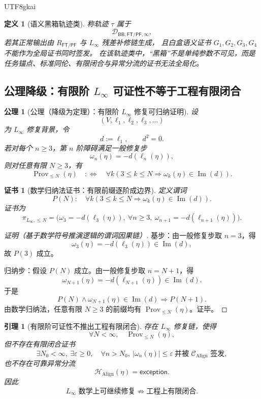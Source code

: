 \documentclass[12pt]{article}
\newtheorem{definition}{定义}[section]
\newtheorem{axiom}{公理}[section]
\newtheorem{lemma}{引理}[section]
\newtheorem{Certificate}{证书}[section]
\newcommand{\Linfty}{\ensuremath{L_\infty}}
\newcommand{\Exc}{\mathsf{exception}}
\newcommand{\FTPF}{\mathsf{FT/PF}}
\newcommand{\BB}{\mathsf{BB}}
\newcommand{\Align}{\operatorname{Align}}
\newcommand{\Prov}{\operatorname{Prov}}
\newcommand{\Imop}{\operatorname{Im}}
\begin{document}
\begin{CJK*}{UTF8}{gkai}
\begin{definition}[语义黑箱轨迹类]
称轨迹 \(\tau\) 属于
\[
  \mathcal D_{\BB,\FTPF,\infty},
\]
若其正常输出由 \(R_{\FTPF}\) 与 \(\Linfty\) 残差补修链生成，
且白盒语义证书 \(G_1,G_2,G_3,G_4\) 不能作为全局证书同时签发。
在该轨迹类中，“黑箱”不是单纯参数不可见，而是任务锚点、标准同伦、有限闭合与异常分流的证书无法全局化。
\end{definition}

\subsection{公理降级：有限阶 \texorpdfstring{\(\Linfty\)}{L-infinity} 可证性不等于工程有限闭合}
\label{subsec:tex51-linfty-finite-provability}

\begin{axiom}[公理（降级为定理）：有限阶 \texorpdfstring{\(\Linfty\)}{L-infinity} 修复可归纳证明]
\label{ax:tex51-linfty-finite-provability}
设
\[
  (V,\ell_1,\ell_2,\ell_3,\dots)
\]
为 \(\Linfty\) 修复背景，令
\[
  d:=\ell_1,\qquad d^2=0.
\]
若对每个 \(n\ge 3\)，第 \(n\) 阶障碍满足一般修复步
\[
  \omega_n(\eta)=-d(\ell_n(\eta)),
\]
则对任意有限 \(N\ge 3\)，有
\[
  \Prov_{\le N}(\eta)
  \quad:\Longleftrightarrow\quad
  \forall k(3\le k\le N\Rightarrow \omega_k(\eta)\in\Imop(d)).
\]
\end{axiom}

\begin{Certificate}[数学归纳法证书：有限前缀逐阶成边界]
\label{cert:tex51-linfty-finite-provability}
定义谓词
\[
  P(N):\quad
  \forall k(3\le k\le N\Rightarrow \omega_k(\eta)\in\Imop(d)).
\]
证书为
\[
  \pi_{\Linfty,\le N}
  =
  \bigl(
    \omega_3=-d(\ell_3(\eta)),
    \ \forall n\ge 3,\ \omega_{n+1}=-d(\ell_{n+1}(\eta))
  \bigr).
\]
\end{Certificate}

\begin{proof}[证明（基于数学符号推演逻辑的谓词因果链）]
基步：由一般修复步取 \(n=3\)，得
\[
  \omega_3(\eta)=-d(\ell_3(\eta))\in\Imop(d),
\]
故 \(P(3)\) 成立。

归纳步：假设 \(P(N)\) 成立。由一般修复步取 \(n=N+1\)，得
\[
  \omega_{N+1}(\eta)
  =
  -d(\ell_{N+1}(\eta))
  \in\Imop(d).
\]
于是
\[
  P(N)\wedge \omega_{N+1}(\eta)\in\Imop(d)
  \Longrightarrow P(N+1).
\]
由数学归纳法，任意有限 \(N\ge 3\) 的前缀均有 \(\Prov_{\le N}(\eta)\)。证毕。
\end{proof}

\begin{lemma}[有限阶可证性不推出工程有限闭合]
\label{lem:tex51-finite-prov-not-engineering-closure}
存在 \(\Linfty\) 修复链，使得
\[
  \forall N<\infty,\quad \Prov_{\le N}(\eta),
\]
但不存在有限闭合证书
\[
  \exists N_0<\infty,\ \exists\varepsilon\ge 0,\quad
  \forall n>N_0,\ |\omega_n(\eta)|\le\varepsilon
  \ \text{并被 }\mathcal C_{\Align}\text{ 签发},
\]
也不存在可靠异常分流
\[
  \mathcal H_{\Align}(\eta)=\Exc.
\]
因此
\[
  \Linfty\text{ 数学上可继续修复}
  \not\Rightarrow
  \text{工程上有限闭合}.
\]
\end{lemma}


\end{CJK*}
\end{document}
